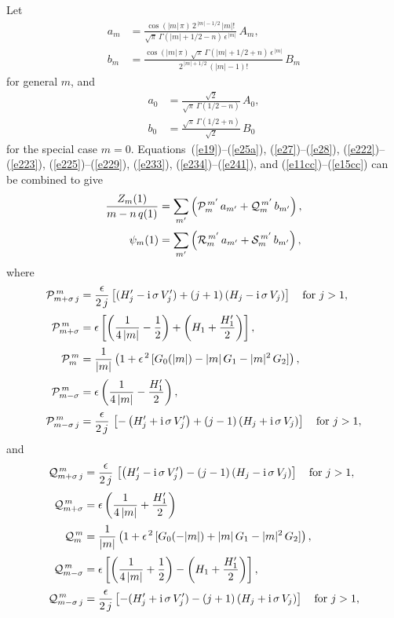 \documentclass[12pt,prb,aps]{revtex4-1}
\begin{document}
Let 
\begin{align}
a_m &= \frac{\cos(|m|\,\pi)\,2^{\,|m|-1/2}\,|m|!}{\sqrt{\pi}\,\Gamma(|m|+1/2-n)\,\epsilon^{\,|m|}}\,A_m,\label{e11cc}\\[0.5ex]
b_m &= \frac{\cos(|m|\,\pi)\,\sqrt{\pi}\,\Gamma(|m|+1/2+n)\,\epsilon^{\,|m|}}{2^{\,|m|+1/2}\,(|m|-1)!}\,B_m\label{e13cc}
\end{align}
for general $m$, and
\begin{align}
a_0 &= \frac{\sqrt{2}}{\sqrt{\pi}\,\Gamma(1/2-n)}\,A_0,\\[0.5ex]
b_0 &= \frac{\sqrt{\pi}\,\Gamma(1/2+n)}{\sqrt{2}}\,B_0\label{e15cc}
\end{align}
for the special case $m=0$. 
Equations~(\ref{e19})--(\ref{e25a}), (\ref{e27})--(\ref{e28}), (\ref{e222})--(\ref{e223}), (\ref{e225})--(\ref{e229}), (\ref{e233}),  (\ref{e234})--(\ref{e241}),
and (\ref{e11cc})--(\ref{e15cc}) 
can be combined to give
\begin{align}
\frac{Z_m(1)}{m-n\,q(1)} &= \sum_{m'}\left({\cal P}_m^{\,m'} \,a_{m'}+ {\cal Q}_{m}^{\,m'}\,b_{m'}\right),\label{e27cc}\\[0.5ex]
\psi_m(1)& = \sum_{m'}\left({\cal R}_m^{\,m'}\,a_{m'} + {\cal S}_{m}^{\,m'}\,b_{m'}\right),\label{e54cc}
\end{align}
where\,\cite{am1}
\begin{align}
{\cal P}_{m+\sigma\,j}^{\,m}  &=\frac{\epsilon}{2\,j}\left[(H_j'-{\rm i}\,\sigma\,V_j')+(j+1)\left(H_j-{\rm i}\,\sigma\,V_j\right)\right]\mbox{~~~for $j>1$},\\[0.5ex]
{\cal P}_{m+\sigma}^{\,m} &=\epsilon\left[\left(\frac{1}{4\,|m|}-\frac{1}{2}\right)+\left(H_1+\frac{H_1'}{2}\right)\right],\\[0.5ex]
{\cal P}_m^{\,m}  &= \frac{1}{|m|}\left(1+\epsilon^{\,2}\,[G_0 (|m|)- |m|\,G_1- |m|^2\,G_2]\right),\\[0.5ex]
{\cal P}_{m-\sigma}^{\,m} &= \epsilon\left(\frac{1}{4\,|m|}- \frac{H_1'}{2}\right),\\[0.5ex]
{\cal P}_{m-\sigma\,j}^{\,m} &= \frac{\epsilon}{2\,j}\,\left[-\left(H_j'+{\rm i}\,\sigma\,V_j'\right)+(j-1)\left(
H_j+{\rm i}\,\sigma\,V_j\right)\right]\mbox{~~~for $j>1$},
\end{align}
and 
\begin{align}
{\cal Q}_{m+\sigma\,j}^{\,m} &=\frac{\epsilon}{2\,j}\,\left[\left(H_j'-{\rm i}\,\sigma\,V_j'\right)-(j-1)\left(
H_j-{\rm i}\,\sigma\,V_j\right)\right]\mbox{~~~for $j>1$}, \\[0.5ex]
{\cal Q}_{m+\sigma}^{\,m} &=\epsilon\left(\frac{1}{4\,|m|}+ \frac{H_1'}{2}\right)\\[0.5ex]
{\cal Q}_m^{\,m} &= \frac{1}{|m|}\left(1+\epsilon^{\,2}\,[G_0 (-|m|)+ |m|\,G_1- |m|^2\,G_2]\right),\\[0.5ex]
{\cal Q}_{m-\sigma}^{\,m} &=\epsilon\left[\left(\frac{1}{4\,|m|}+\frac{1}{2}\right)-\left(H_1+\frac{H_1'}{2}\right)\right], \\[0.5ex]
{\cal Q}_{m-\sigma\,j}^{\,m} &=  \frac{\epsilon}{2\,j}\left[-(H_j'+{\rm i}\,\sigma\,V_j')-(j+1)\left(H_j+{\rm i}\,\sigma\,V_j\right)\right]\mbox{~~~for $j>1$},
\end{align}
\end{document}

